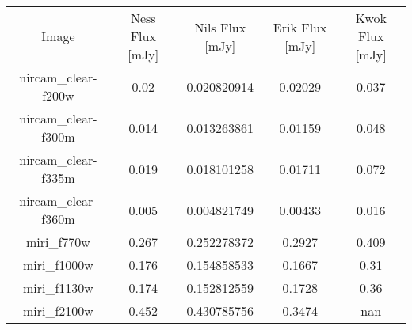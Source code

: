 \begin{table}
\begin{tabular}{ccccc}
Image & Ness Flux [mJy] & Nils Flux [mJy] & Erik Flux [mJy] & Kwok Flux [mJy] \\
nircam_clear-f200w & 0.02 & 0.020820914 & 0.02029 & 0.037 \\
nircam_clear-f300m & 0.014 & 0.013263861 & 0.01159 & 0.048 \\
nircam_clear-f335m & 0.019 & 0.018101258 & 0.01711 & 0.072 \\
nircam_clear-f360m & 0.005 & 0.004821749 & 0.00433 & 0.016 \\
miri_f770w & 0.267 & 0.252278372 & 0.2927 & 0.409 \\
miri_f1000w & 0.176 & 0.154858533 & 0.1667 & 0.31 \\
miri_f1130w & 0.174 & 0.152812559 & 0.1728 & 0.36 \\
miri_f2100w & 0.452 & 0.430785756 & 0.3474 & nan \\
\end{tabular}
\end{table}
